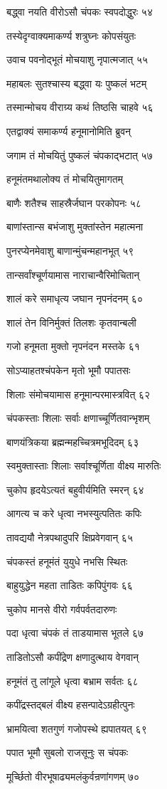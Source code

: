 बद्ध्वा नयति वीरोऽसौ चंपकः स्वपदोद्धुरः ५४

तस्येदृग्वाक्यमाकर्ण्य शत्रुघ्नः कोपसंयुतः

उवाच पवनोद्भूतं मोचयाशु नृपात्मजात् ५५

महाबलः सुतश्चास्य बद्ध्वा यः पुष्कलं भटम्

तस्मान्मोचय वीराग्र्य कथं तिष्ठसि चाहवे ५६

एतद्वाक्यं समाकर्ण्य हनूमानोमिति ब्रुवन्

जगाम तं मोचयितुं पुष्कलं चंपकाद्भटात् ५७

हनूमंतमथालोक्य तं मोचयितुमागतम्

बाणैः शतैश्च साहस्रैर्जघान परकोपनः ५८

बाणांस्तान्स बभंजाशु मुक्तांस्तेन महात्मना

पुनरप्येनमेवाशु बाणान्मुंचन्महानभूत् ५९

तान्सर्वांश्चूर्णयामास नाराचान्वैरिमोचितान्

शालं करे समाधृत्य जघान नृपनंदनम् ६०

शालं तेन विनिर्मुक्तं तिलशः कृतवान्बली

गजो हनूमता मुक्तो नृपनंदन मस्तके ६१

सोऽप्याहतश्चंपकेन मृतो भूमौ पपातसः

शिलाः संमोचयामास हनूमान्परमास्त्रवित् ६२

चंपकस्ताः शिलाः सर्वाः क्षणाच्चूर्णितवान्भृशम्

बाणयंत्रिकया ब्रह्मन्महच्चित्रमभूदिदम् ६३

स्वमुक्तास्ताः शिलाः सर्वाश्चूर्णिता वीक्ष्य मारुतिः

चुकोप हृदयेऽत्यतं बहुवीर्यमिति स्मरन् ६४

आगत्य च करे धृत्वा नभस्युत्पतितः कपिः

तावद्ययौ नेत्रपथादुपरि क्षिप्रवेगवान् ६५

चंपकस्तं हनूमंतं युयुधे नभसि स्थितः

बाहुयुद्धेन महता ताडितः कपिपुंगवः ६६

चुकोप मानसे वीरो गर्वपर्वतदारुणः

पदा धृत्वा चंपकं तं ताडयामास भूतले ६७

ताडितोऽसौ कपींद्रेण क्षणादुत्थाय वेगवान्

हनूमंतं तु लांगूले धृत्वा बभ्राम सर्वतः ६८

कपींद्रस्तद्बलं वीक्ष्य हसन्पादेऽग्रहीत्पुनः

भ्रामयित्वा शतगुणं गजोपस्थे ह्यपातयत् ६९

पपात भूमौ सुबलो राजसूनुः स चंपकः

मूर्च्छितो वीरभूषाढ्यमलंकुर्वन्रणांगणम् ७०

